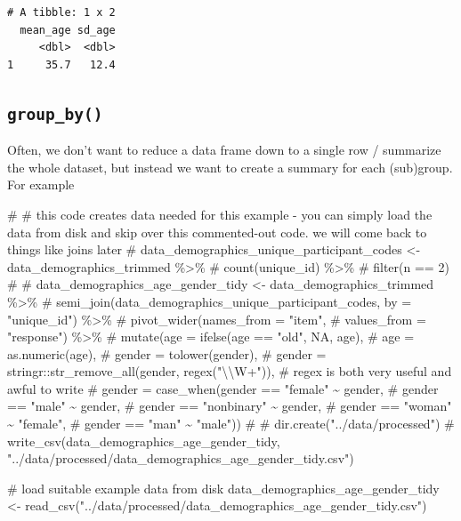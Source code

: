 \documentclass[
  letterpaper,
  DIV=11,
  numbers=noendperiod]{scrreprt}
\newenvironment{Shaded}{\begin{snugshade}}{\end{snugshade}}
\newcommand{\CommentTok}[1]{\textcolor[rgb]{0.37,0.37,0.37}{#1}}
\newcommand{\FunctionTok}[1]{\textcolor[rgb]{0.28,0.35,0.67}{#1}}
\newcommand{\NormalTok}[1]{\textcolor[rgb]{0.00,0.23,0.31}{#1}}
\newcommand{\OtherTok}[1]{\textcolor[rgb]{0.00,0.23,0.31}{#1}}
\newcommand{\StringTok}[1]{\textcolor[rgb]{0.13,0.47,0.30}{#1}}
\begin{document}
\begin{verbatim}
# A tibble: 1 x 2
  mean_age sd_age
     <dbl>  <dbl>
1     35.7   12.4
\end{verbatim}

\subsection{\texorpdfstring{\texttt{group\_by()}}{group\_by()}}\label{group_by}

Often, we don't want to reduce a data frame down to a single row /
summarize the whole dataset, but instead we want to create a summary for
each (sub)group. For example

\begin{Shaded}
\begin{Highlighting}[]
\CommentTok{\# \# this code creates data needed for this example {-} you can simply load the data from disk and skip over this commented{-}out code. we will come back to things like \textquotesingle{}joins\textquotesingle{} later}
\CommentTok{\# data\_demographics\_unique\_participant\_codes \textless{}{-} data\_demographics\_trimmed \%\textgreater{}\%}
\CommentTok{\#   count(unique\_id) \%\textgreater{}\%}
\CommentTok{\#   filter(n == 2)}
\CommentTok{\# }
\CommentTok{\# data\_demographics\_age\_gender\_tidy \textless{}{-} data\_demographics\_trimmed \%\textgreater{}\%}
\CommentTok{\#   semi\_join(data\_demographics\_unique\_participant\_codes, by = "unique\_id") \%\textgreater{}\%}
\CommentTok{\#   pivot\_wider(names\_from = "item",}
\CommentTok{\#               values\_from = "response") \%\textgreater{}\%}
\CommentTok{\#   mutate(age = ifelse(age == "old", NA, age),}
\CommentTok{\#          age = as.numeric(age),}
\CommentTok{\#          gender = tolower(gender),}
\CommentTok{\#          gender = stringr::str\_remove\_all(gender, regex("\textbackslash{}\textbackslash{}W+")), \# regex is both very useful and awful to write}
\CommentTok{\#          gender = case\_when(gender == "female" \textasciitilde{} gender,}
\CommentTok{\#                             gender == "male" \textasciitilde{} gender,}
\CommentTok{\#                             gender == "nonbinary" \textasciitilde{} gender,}
\CommentTok{\#                             gender == "woman" \textasciitilde{} "female",}
\CommentTok{\#                             gender == "man" \textasciitilde{} "male"))}
\CommentTok{\# }
\CommentTok{\# dir.create("../data/processed")}
\CommentTok{\# write\_csv(data\_demographics\_age\_gender\_tidy, "../data/processed/data\_demographics\_age\_gender\_tidy.csv")}

\CommentTok{\# load suitable example data from disk}
\NormalTok{data\_demographics\_age\_gender\_tidy }\OtherTok{\textless{}{-}}
  \FunctionTok{read\_csv}\NormalTok{(}\StringTok{"../data/processed/data\_demographics\_age\_gender\_tidy.csv"}\NormalTok{)}
\end{Highlighting}
\end{Shaded}
\end{document}
